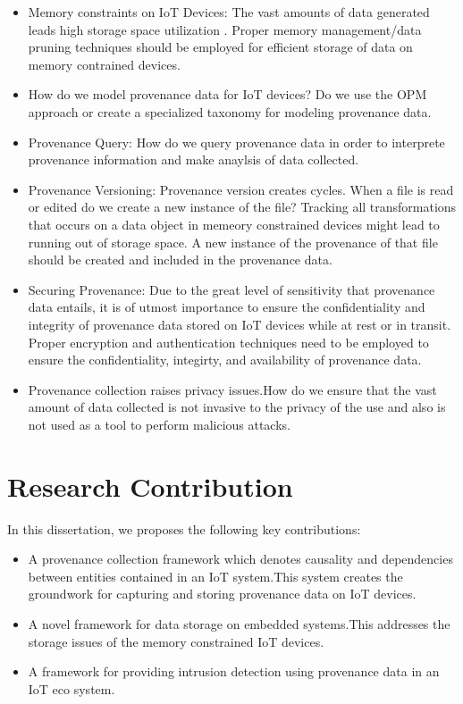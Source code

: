 \begin{itemize}

\item Memory constraints on IoT Devices: The vast amounts of data generated leads high storage space utilization . Proper memory management/data pruning techniques should be employed for efficient storage of data on memory contrained devices. 

\item How do we model provenance data for IoT devices? Do we use the OPM approach or create a specialized taxonomy for modeling provenance data.

\item Provenance Query: How do we query provenance data in order to interprete provenance information and make anaylsis of data collected.

\item Provenance Versioning: Provenance version creates cycles. When a file is read or edited do we create a new instance of the file? Tracking all transformations that occurs on a data object in memeory constrained devices might lead to running out of storage space. A new instance of the provenance of that file should be created and included in the provenance data.

\item Securing Provenance: Due to the great level of sensitivity that  provenance data entails, it is of utmost importance to ensure the confidentiality and integrity of provenance data stored on IoT devices while at rest or in transit. Proper encryption and authentication techniques need to be employed to ensure the confidentiality, integirty, and availability of provenance data.

\item Provenance collection raises privacy issues.How do we ensure that the vast amount of data collected is not invasive to the privacy of the use and also is not used as a tool to perform malicious attacks.
\end{itemize}

\section{Research Contribution}

In this dissertation, we proposes the following key contributions:

\begin{itemize}
  \item A provenance collection framework which denotes causality and dependencies between entities contained in an IoT system.This system creates the groundwork for capturing and storing provenance data  on IoT devices.
  \item A novel framework for data storage on embedded systems.This addresses the storage issues of the memory constrained IoT devices.
   \item A framework for providing intrusion detection using provenance data in an IoT eco system.
\end{itemize}

